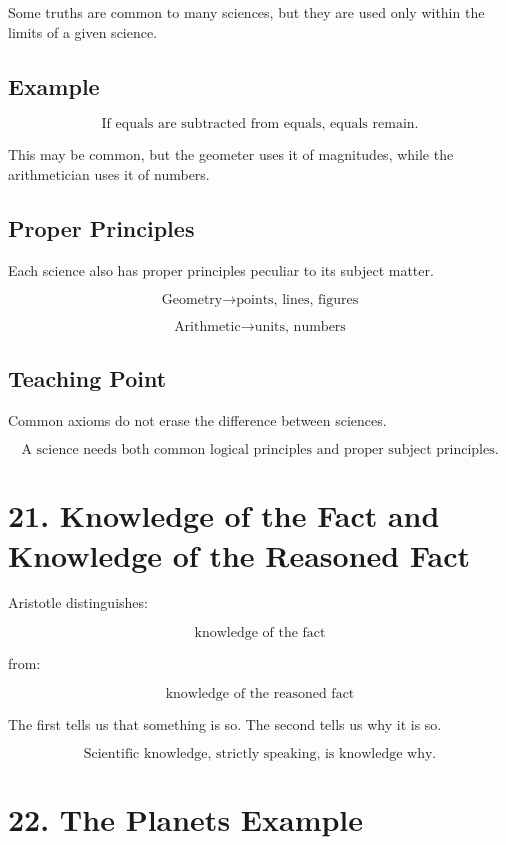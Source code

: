 \documentclass[12pt]{article}
\begin{document}
Some truths are common to many sciences, but they are used only within the
limits of a given science.

\subsection*{Example}

\[
\text{If equals are subtracted from equals, equals remain.}
\]

This may be common, but the geometer uses it of magnitudes, while the
arithmetician uses it of numbers.

\subsection*{Proper Principles}

Each science also has proper principles peculiar to its subject matter.

\[
\text{Geometry} \rightarrow \text{points, lines, figures}
\]

\[
\text{Arithmetic} \rightarrow \text{units, numbers}
\]

\subsection*{Teaching Point}

Common axioms do not erase the difference between sciences.

\[
\boxed{
\text{A science needs both common logical principles and proper subject principles.}
}
\]

\section*{21. Knowledge of the Fact and Knowledge of the Reasoned Fact}

Aristotle distinguishes:

\[
\text{knowledge of the fact}
\]

from:

\[
\text{knowledge of the reasoned fact}
\]

The first tells us that something is so. The second tells us why it is so.

\[
\boxed{
\text{Scientific knowledge, strictly speaking, is knowledge why.}
}
\]

\section*{22. The Planets Example}
\end{document}
